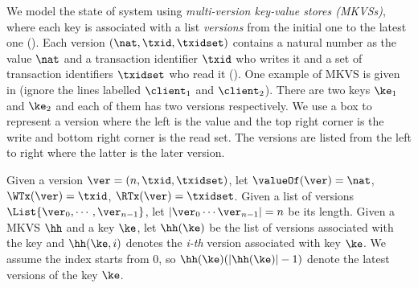 We model the state of system using \emph{multi-version key-value stores (MKVSs)}, where each key is associated with a list \emph{versions} from the initial one to the latest one ().
Each version \( ( \nat, \txid, \txidset ) \) contains a natural number as the value \( \nat \) and a transaction identifier \( \txid \) who writes it and a set of transaction identifiers \( \txidset \) who read it ().
One example of MKVS is given in  (ignore the lines labelled $\client_1$ and $\client_2$).
There are two keys \( \ke_1\) and \( \ke_2 \) and each of them has two versions respectively.
We use a box to represent a version where the left is the value and the top right corner is the write and bottom right corner is the read set.
The versions are listed from the left to right where the latter is the later version.

Given a version $\ver = (n, \txid, \txidset)$, let $\valueOf(\ver) = \nat$, $\WTx(\ver) = \txid$, $\RTx(\ver) = \txidset$. 
Given a list of versions $\List{\ver_0, \cdots, \ver_{n-1}}$, let $\lvert \ver_0 \cdots \ver_{n-1} \rvert = n$ be its length.
Given a MKVS $\hh$ and a key $\ke$, let $\hh(\ke)$ be the list of versions associated with the key and \(\hh(\ke,i) \) denotes the \emph{i-th} version associated with key \( \ke \).
We assume the index starts from 0, so \( \hh(\ke)(\left|\hh(\ke)\right| - 1)\) denote the latest versions of the key \( \ke \).


